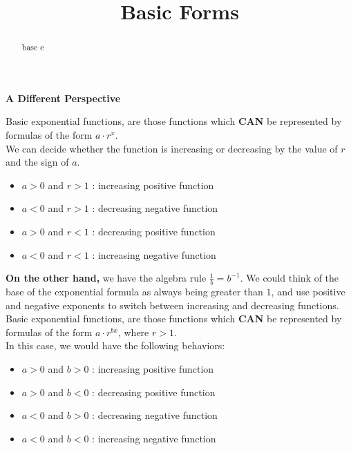 \documentclass{ximera}
\title{Basic Forms}
\begin{document}
\begin{abstract}
base e
\end{abstract}
\maketitle






\textbf{\textcolor{blue!55!black}{A Different Perspective}} 


Basic exponential functions, are those functions which \textbf{\textcolor{red!80!black}{CAN}} be represented by formulas of the form $a \cdot r^x$.  \\


We can decide whether the function is increasing or decreasing by the value of $r$ and the sign of $a$. \\



\begin{itemize}
\item $a > 0$ and $r > 1$ : increasing positive function
\item $a < 0$ and $r > 1$ : decreasing negative function  
\item $a > 0$ and $r < 1$ : decreasing positive function
\item $a < 0$ and $r < 1$ : increasing negative function  
\end{itemize}



\textbf{On the other hand,} we have the algebra rule $\frac{1}{b} = b^{-1}$.  We could think of the base of the exponential formula as always being greater than $1$, and use positive and negative exponents to switch between increasing and decreasing functions. \\


Basic exponential functions, are those functions which \textbf{\textcolor{red!80!black}{CAN}} be represented by formulas of the form $a \cdot r^{b x}$, where $r > 1$.  \\


In this case, we would have the following behaviors: \\


\begin{itemize}
\item $a > 0$ and $b > 0$ : increasing positive function
\item $a > 0$ and $b < 0$ : decreasing positive function
\item $a < 0$ and $b > 0$ : decreasing negative function  
\item $a < 0$ and $b < 0$ : increasing negative function  
\end{itemize}
\end{document}
